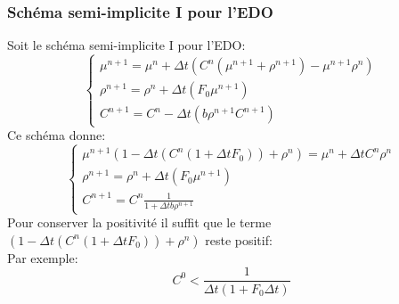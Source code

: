 \documentclass[11pt]{article}
\newcommand{\Dt}{\Delta t}
\begin{document}
\subsubsection{Schéma semi-implicite I pour l'EDO}
Soit le schéma semi-implicite I pour l'EDO:
\begin{equation} \boxed{\left\{
                \begin{array}{ll}
                   \mu^{n+1} = \mu^{n}+  \Dt( C^{n}(\mu^{n+1} + \rho^{n+1}) -\mu^{n+1}\rho^{n})\\
                \rho^{n+1}=  \rho^{n}+ \Dt (F_0 \mu^{n+1}) \\
                 C^{n+1} =C^{n}- \Dt(b\rho^{n+1}C^{n+1})
                \end{array}
              \right.}
\end{equation}
Ce schéma donne:
\begin{equation*} \left\{
                \begin{array}{ll}
                   \mu^{n+1}(1-\Dt(C^{n}(1+\Dt F_0)) + \rho^{n}) = \mu^{n}+  \Dt C^{n}\rho^{n} \\
                \rho^{n+1}=  \rho^{n}+ \Dt (F_0 \mu^{n+1}) \\
                 C^{n+1} =C^{n}\frac{1}{1+ \Dt b\rho^{n+1}}
                \end{array}
              \right.
\end{equation*}
Pour conserver la positivité il suffit que le terme $(1-\Dt(C^{n}(1+\Dt F_0)) + \rho^{n}) $ reste positif:\\
Par exemple: 
\begin{equation}
	\boxed{C^0< \frac{1}{\Dt(1+F_0\Dt)}}
\end{equation}
\end{document}

